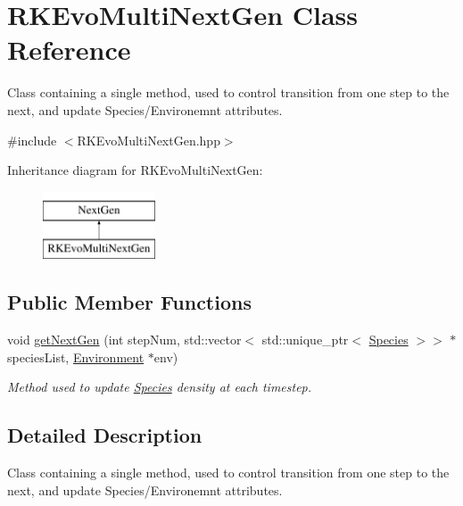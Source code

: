 \hypertarget{classRKEvoMultiNextGen}{}\section{R\+K\+Evo\+Multi\+Next\+Gen Class Reference}
\label{classRKEvoMultiNextGen}


Class containing a single method, used to control transition from one step to the next, and update Species/\+Environemnt attributes.  




{\ttfamily \#include $<$R\+K\+Evo\+Multi\+Next\+Gen.\+hpp$>$}

Inheritance diagram for R\+K\+Evo\+Multi\+Next\+Gen\+:\begin{figure}[H]
\begin{center}
\leavevmode
\includegraphics[height=2.000000cm]{classRKEvoMultiNextGen}
\end{center}
\end{figure}
\subsection*{Public Member Functions}
\begin{DoxyCompactItemize}
\item 
void \hyperlink{classRKEvoMultiNextGen_a4b40973651eea9235660af61316b11f6}{get\+Next\+Gen} (int step\+Num, std\+::vector$<$ std\+::unique\+\_\+ptr$<$ \hyperlink{classSpecies}{Species} $>$$>$ $\ast$species\+List, \hyperlink{classEnvironment}{Environment} $\ast$env)
\begin{DoxyCompactList}\small\item\em Method used to update \hyperlink{classSpecies}{Species} density at each timestep. \end{DoxyCompactList}\end{DoxyCompactItemize}


\subsection{Detailed Description}
Class containing a single method, used to control transition from one step to the next, and update Species/\+Environemnt attributes. 

